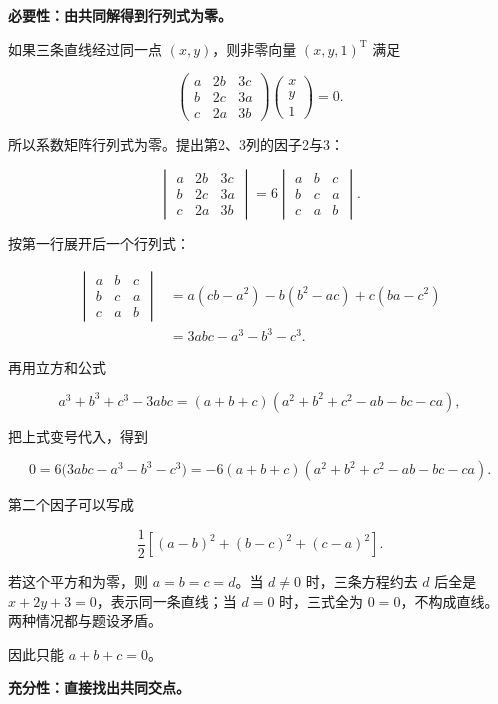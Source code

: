 \documentclass[UTF8,11pt,fontset=windows]{ctexart}
\begin{document}
\textbf{必要性：由共同解得到行列式为零。}

如果三条直线经过同一点 $(x,y)$，则非零向量 $(x,y,1)^{\mathrm T}$ 满足

$$
\begin{pmatrix}a&2b&3c\\b&2c&3a\\c&2a&3b\end{pmatrix}
\begin{pmatrix}x\\y\\1\end{pmatrix}=0.
$$

所以系数矩阵行列式为零。提出第2、3列的因子2与3：

$$
\begin{vmatrix}a&2b&3c\\b&2c&3a\\c&2a&3b\end{vmatrix}
=6\begin{vmatrix}a&b&c\\b&c&a\\c&a&b\end{vmatrix}.
$$

按第一行展开后一个行列式：

$$
\begin{aligned}
\begin{vmatrix}a&b&c\\b&c&a\\c&a&b\end{vmatrix}
&=a(cb-a^2)-b(b^2-ac)+c(ba-c^2)\\
&=3abc-a^3-b^3-c^3.
\end{aligned}
$$

再用立方和公式

$$
a^3+b^3+c^3-3abc=(a+b+c)(a^2+b^2+c^2-ab-bc-ca),
$$

把上式变号代入，得到

$$
0=6\bigl(3abc-a^3-b^3-c^3\bigr)
=-6(a+b+c)(a^2+b^2+c^2-ab-bc-ca).
$$

第二个因子可以写成

$$
\frac12[(a-b)^2+(b-c)^2+(c-a)^2].
$$

若这个平方和为零，则 $a=b=c=d$。当 $d\ne0$ 时，三条方程约去 $d$ 后全是 $x+2y+3=0$，表示同一条直线；当 $d=0$ 时，三式全为 $0=0$，不构成直线。两种情况都与题设矛盾。

因此只能 $a+b+c=0$。

\textbf{充分性：直接找出共同交点。}
\end{document}
